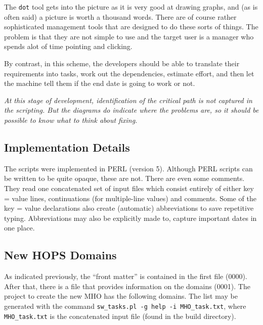 The \texttt{dot} tool gets into the picture as it is very good at drawing
graphs, and (as is often said) a picture is worth a thousand words.
There are of course rather sophisticated management tools that are designed
to do these sorts of things.  The problem is that they are not simple to use
and the target user is a manager who spends alot of time pointing and clicking.

By contrast, in this scheme, the developers should be able to translate
their requirements into tasks, work out the dependencies, estimate effort,
and then let the machine tell them if the end date is going to work or not.

\textit{At this stage of development, identification of the critical path
is not captured in the scripting.  But the diagrams do indicate where the
problems are, so it should be possible to know what to think about fixing.}

\subsection{Implementation Details}

The scripts were implemented in \ac{PERL} (version 5).  Although \ac{PERL}
scripts can be written to be quite opaque, these are not.  There are even
some comments.  They read one concatenated set of input files which consist
entirely of either key = value lines, continuations (for multiple-line values)
and comments.  Some of the key = value declarations also create (automatic)
abbreviations to save repetitive typing.  Abbreviations may also be explicitly
made to, \eg capture important dates in one place.


\subsection{New HOPS Domains}

As indicated previously, the ``front matter'' is contained in the
first file (0000).  After that, there is a file that provides
information on the domains (0001).
The project to create the new \ac{MHO} has the following domains.  The
list may be generated with the command
\texttt{sw\_tasks.pl -g help -i MHO\_task.txt}, where
\texttt{MHO\_task.txt} is the concatenated input file (found in the build
directory).



